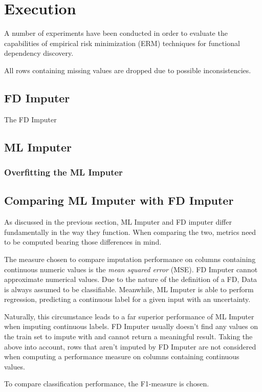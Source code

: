 \newpage
\section{Execution}
A number of experiments have been conducted in order to evaluate the capabilities of empirical risk minimization (ERM) techniques for functional dependency discovery.

All rows containing missing values are dropped due to possible inconsistencies.

\subsection{FD Imputer}
The FD Imputer

\subsection{ML Imputer}

\subsubsection{Overfitting the ML Imputer}

\subsection{Comparing ML Imputer with FD Imputer}
As discussed in the previous section, ML Imputer and FD imputer differ fundamentally in the way they function.
When comparing the two, metrics need to be computed bearing those differences in mind.

The measure chosen to compare imputation performance on columns containing continuous numeric values is the \emph{mean squared error} (MSE).
FD Imputer cannot approximate numerical values.
Due to the nature of the definition of a FD, Data is always assumed to be classifiable.
Meanwhile, ML Imputer is able to perform regression, predicting a continuous label for a given input with an uncertainty.

Naturally, this circumstance leads to a far superior performance of ML Imputer when imputing continuous labels.
FD Imputer usually doesn't find any values on the train set to impute with and cannot return a meaningful result.
Taking the above into account, rows that aren't imputed by FD Imputer are not considered when computing a performance measure on columns containing continuous values.

To compare classification performance, the F1-measure is chosen.

